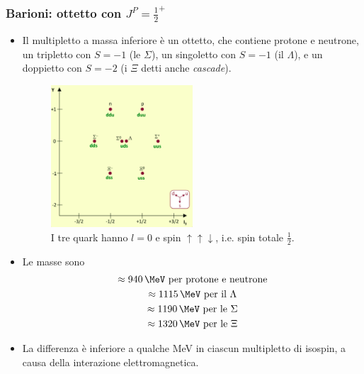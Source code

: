 \subsubsection{Barioni: ottetto con $J^P=\frac12^+$}
\begin{itemize}
\item Il multipletto a massa inferiore è un ottetto, che contiene protone e neutrone, un tripletto con $S=-1$ (le $\Sigma$), un singoletto con $S=-1$ (il $\Lambda$), e un doppietto con $S=-2$ (i $\Xi$ detti anche \textit{cascade}).
\begin{figure}[H]
    \centering
    \includegraphics[width=0.5\textwidth]{immagini/fig_baryon_12_quarks.png}
    \caption{I tre quark hanno $l=0$ e spin $\uparrow\uparrow\downarrow$, i.e. spin totale $\frac12$.}
  \end{figure}
  \item Le masse sono
  \begin{gather*}
  \approx940\,\MeV\text{ per protone e neutrone}\\
  \approx1115\,\MeV\text{ per il }\Lambda\\
  \approx1190\,\MeV\text{ per le }\Sigma\\
  \approx1320\,\MeV\text{ per le }\Xi
  \end{gather*}
  \item La differenza è inferiore a qualche MeV in ciascun multipletto di isospin, a causa della interazione elettromagnetica. 
\end{itemize}
